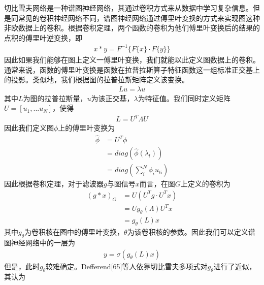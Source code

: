 切比雪夫网络是一种谱图神经网络，其通过卷积方式来从数据中学习复杂信息\cite{proakis_digital_1996}。但是同常见的卷积神经网络不同，谱图神经网络通过傅里叶变换的方式来实现图这种非欧数据上的卷积。根据卷积定理\cite{stahlschmidt_multimodal_2022}，两个函数的卷积为他们傅里叶变换后的结果的点积的傅里叶逆变换，即
\begin{equation}\begin{aligned}
x * y=F^{-1}\{F\{x\}\cdot F\{y\} \}
\end{aligned}\end{equation}
因此如果我们能够在图上定义一傅里叶变换，我们就能以此定义图数据上的卷积。通常来说，函数的傅里叶变换是函数在拉普拉斯算子特征函数这一组标准正交基上的投影。类似地，我们根据图的拉普拉斯矩阵定义该变换。
\begin{equation}\begin{aligned}
Lu=\lambda u
\end{aligned}\end{equation}
其中$L$为图的拉普拉斯量，$u$为该正交基，$\lambda$为特征值。我们同时定义矩阵$U=[u_1,...u_N]$，使得
\begin{equation}\begin{aligned}
L=U^T\Lambda U
\end{aligned}\end{equation}
因此我们定义图$\phi$上的傅里叶变换为
\begin{equation}\begin{aligned}
\hat \phi &=U^T\phi \\
&=diag(\hat \phi(\lambda_l))\\
&=diag(\sum_i^N\phi_iu_{li})
\end{aligned}\end{equation}
因此根据卷积定理，对于滤波器$g$与图信号$x$而言，在图$G$上定义的卷积为
\begin{equation}\begin{aligned}
(g*x)_{G}&=U(U^Tg\cdot U^Tx)\\
&=Ug_\theta(\Lambda) U^Tx\\
&=g_\theta(L)x
\end{aligned}\end{equation}
其中$g_\theta$为卷积核在图中的傅里叶变换，$\theta$为该卷积核的参数。因此我们可以定义谱图神经网络中的一层为
\begin{equation}\begin{aligned}
y=\sigma(g_\theta(L)x)
\end{aligned}\end{equation}
但是，此时$g_\theta$较难确定。Defferend[65]等人依靠切比雪夫多项式对$g_\theta$进行了近似，其认为
